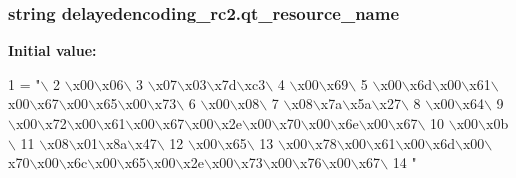 \subsubsection[{qt\+\_\+resource\+\_\+name}]{\setlength{\rightskip}{0pt plus 5cm}string delayedencoding\+\_\+rc2.\+qt\+\_\+resource\+\_\+name}\label{namespacedelayedencoding__rc2_a8b0fd986f5925a00682285d36020476e}
{\bfseries Initial value\+:}
\begin{DoxyCode}
1 = \textcolor{stringliteral}{"\(\backslash\)}
2 \textcolor{stringliteral}{\(\backslash\)x00\(\backslash\)x06\(\backslash\)}
3 \textcolor{stringliteral}{\(\backslash\)x07\(\backslash\)x03\(\backslash\)x7d\(\backslash\)xc3\(\backslash\)}
4 \textcolor{stringliteral}{\(\backslash\)x00\(\backslash\)x69\(\backslash\)}
5 \textcolor{stringliteral}{\(\backslash\)x00\(\backslash\)x6d\(\backslash\)x00\(\backslash\)x61\(\backslash\)x00\(\backslash\)x67\(\backslash\)x00\(\backslash\)x65\(\backslash\)x00\(\backslash\)x73\(\backslash\)}
6 \textcolor{stringliteral}{\(\backslash\)x00\(\backslash\)x08\(\backslash\)}
7 \textcolor{stringliteral}{\(\backslash\)x08\(\backslash\)x7a\(\backslash\)x5a\(\backslash\)x27\(\backslash\)}
8 \textcolor{stringliteral}{\(\backslash\)x00\(\backslash\)x64\(\backslash\)}
9 \textcolor{stringliteral}{\(\backslash\)x00\(\backslash\)x72\(\backslash\)x00\(\backslash\)x61\(\backslash\)x00\(\backslash\)x67\(\backslash\)x00\(\backslash\)x2e\(\backslash\)x00\(\backslash\)x70\(\backslash\)x00\(\backslash\)x6e\(\backslash\)x00\(\backslash\)x67\(\backslash\)}
10 \textcolor{stringliteral}{\(\backslash\)x00\(\backslash\)x0b\(\backslash\)}
11 \textcolor{stringliteral}{\(\backslash\)x08\(\backslash\)x01\(\backslash\)x8a\(\backslash\)x47\(\backslash\)}
12 \textcolor{stringliteral}{\(\backslash\)x00\(\backslash\)x65\(\backslash\)}
13 \textcolor{stringliteral}{\(\backslash\)x00\(\backslash\)x78\(\backslash\)x00\(\backslash\)x61\(\backslash\)x00\(\backslash\)x6d\(\backslash\)x00\(\backslash\)x70\(\backslash\)x00\(\backslash\)x6c\(\backslash\)x00\(\backslash\)x65\(\backslash\)x00\(\backslash\)x2e\(\backslash\)x00\(\backslash\)x73\(\backslash\)x00\(\backslash\)x76\(\backslash\)x00\(\backslash\)x67\(\backslash\)}
14 \textcolor{stringliteral}{"}
\end{DoxyCode}
\hypertarget{namespacedelayedencoding__rc2_aa14f7bc522563bee402d5e21fb75dbe6}{}
